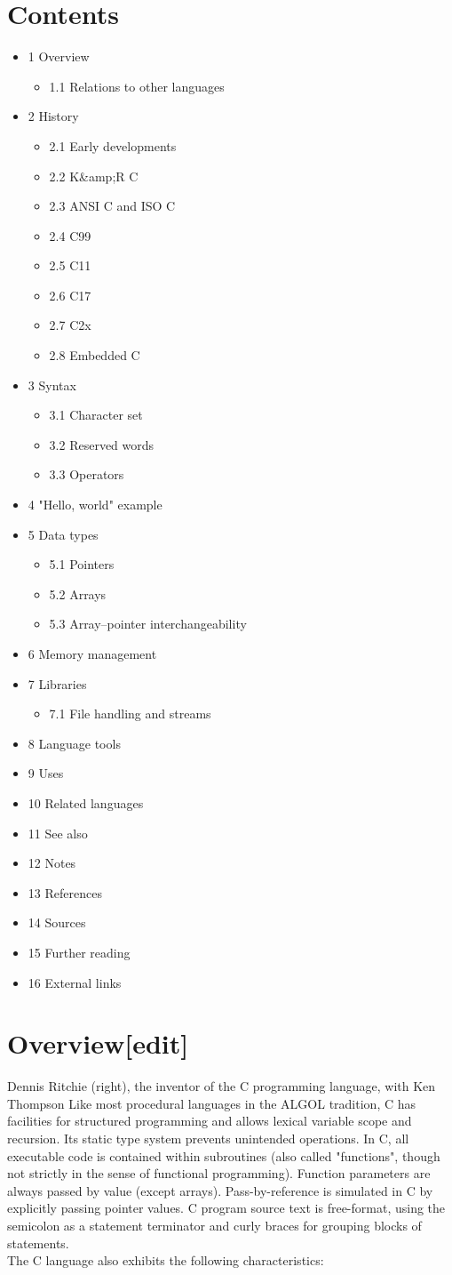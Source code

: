 \documentclass{article}\usepackage{titlesec}
\begin{document}
\section{Contents}
\begin{itemize}
\item1 Overview
\begin{itemize}
\item1.1 Relations to other languages
\end{itemize}

\item2 History
\begin{itemize}
\item2.1 Early developments
\item2.2 K&amp;R C
\item2.3 ANSI C and ISO C
\item2.4 C99
\item2.5 C11
\item2.6 C17
\item2.7 C2x
\item2.8 Embedded C
\end{itemize}

\item3 Syntax
\begin{itemize}
\item3.1 Character set
\item3.2 Reserved words
\item3.3 Operators
\end{itemize}

\item4 "Hello, world" example
\item5 Data types
\begin{itemize}
\item5.1 Pointers
\item5.2 Arrays
\item5.3 Array–pointer interchangeability
\end{itemize}

\item6 Memory management
\item7 Libraries
\begin{itemize}
\item7.1 File handling and streams
\end{itemize}

\item8 Language tools
\item9 Uses
\item10 Related languages
\item11 See also
\item12 Notes
\item13 References
\item14 Sources
\item15 Further reading
\item16 External links
\end{itemize}


\section{Overview[edit]}
  Dennis Ritchie (right), the inventor of the C programming language, with Ken Thompson
Like most procedural languages in the ALGOL tradition, C has facilities for structured programming and allows lexical variable scope and recursion. Its static type system prevents unintended operations. In C, all executable code is contained within subroutines (also called "functions", though not strictly in the sense of functional programming). Function parameters are always passed by value (except arrays). Pass-by-reference is simulated in C by explicitly passing pointer values. C program source text is free-format, using the semicolon as a statement terminator and curly braces for grouping blocks of statements.
\\
The C language also exhibits the following characteristics:
\\
\end{document}
